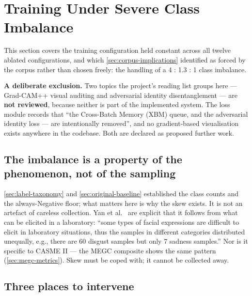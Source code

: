 
\section{Training Under Severe Class Imbalance}
\label{sec:imbalance-review}

This section covers the training configuration held constant across all twelve ablated configurations, and which \autoref{sec:corpus-implications} identified as forced by the corpus rather than chosen freely: the handling of a 4 : 1.3 : 1 class imbalance.

\textbf{A deliberate exclusion.} Two topics the project's reading list groups here --- Grad-CAM++ visual auditing and adversarial identity disentanglement --- are \textbf{not reviewed}, because neither is part of the implemented system. The loss module records that ``the Cross-Batch Memory (XBM) queue, and the adversarial identity loss --- are intentionally removed'', and no gradient-based visualisation exists anywhere in the codebase. Both are declared as proposed further work.

\subsection{The imbalance is a property of the phenomenon, not of the sampling}
\label{sec:imbalance-property}

\autoref{sec:label-taxonomy} and \autoref{sec:original-baseline} established the class counts and the always-Negative floor; what matters here is why the skew exists. It is not an artefact of careless collection. Yan et al.~\cite{yan2014} are explicit that it follows from what can be elicited in a laboratory: ``some types of facial expressions are difficult to elicit in laboratory situations, thus the samples in different categories distributed unequally, e.g., there are 60 disgust samples but only 7 sadness samples.'' Nor is it specific to CASME II --- the MEGC composite shows the same pattern (\autoref{sec:megc-metrics}). Skew must be coped with; it cannot be collected away.

\subsection{Three places to intervene}
\label{sec:imbalance-three-places}

